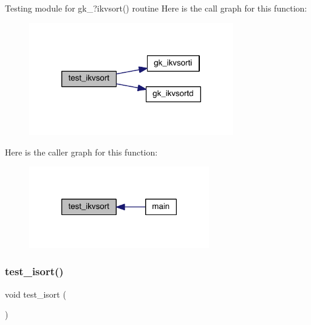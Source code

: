 Testing module for gk\+\_\+?ikvsort() routine Here is the call graph for this function\+:\nopagebreak
\begin{figure}[H]
\begin{center}
\leavevmode
\includegraphics[width=252pt]{a00152_a03d0ef2537e50ad38d65892cc9c28118_cgraph}
\end{center}
\end{figure}
Here is the caller graph for this function\+:\nopagebreak
\begin{figure}[H]
\begin{center}
\leavevmode
\includegraphics[width=222pt]{a00152_a03d0ef2537e50ad38d65892cc9c28118_icgraph}
\end{center}
\end{figure}
\mbox{\label{a00152_a8de21ffeb988c6322635a778ecdd4066}} 
\subsubsection{\texorpdfstring{test\+\_\+isort()}{test\_isort()}}
{\footnotesize\ttfamily void test\+\_\+isort (\begin{DoxyParamCaption}{ }\end{DoxyParamCaption})}

